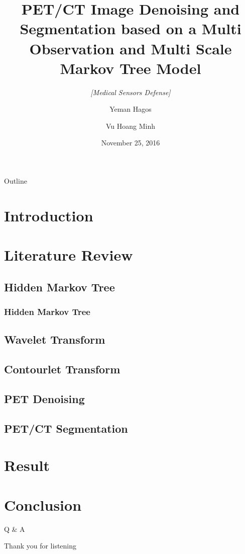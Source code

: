 \documentclass[11pt,aspectratio=43]{beamer}
\title[{PET/CT Denoising and Segmentation }]{\textbf{PET/CT Image Denoising and Segmentation based on a Multi Observation and Multi Scale Markov Tree Model}}
\subtitle{\textit{[Medical Sensors Defense]}}
\author{Yeman Hagos \and Vu Hoang Minh}
\institute[] %
{
  University of Bourgogne
  }
\date{November 25, 2016}
\begin{document}
\begin{frame}
  \titlepage
\end{frame}

\begin{frame}{Outline}
  \tableofcontents
\end{frame}

\section{Introduction}



\section{Literature Review}
\subsection{Hidden Markov Tree}
\begin{frame}
	\frametitle{Hidden Markov Tree}		
\end{frame}
\subsection{Wavelet Transform}
\subsection{Contourlet Transform}
\subsection{PET Denoising}
\subsection{PET/CT Segmentation}
\section{Result}
\section{Conclusion}






%










\begin{frame}
	\centering
	\huge{Q \& A}	
\end{frame}

\begin{frame}
	\centering
	\huge{Thank you for listening}	
\end{frame}
\end{document}
